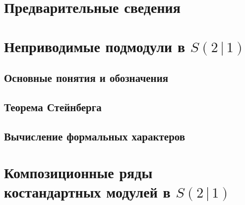 %	
%	

\section{Предварительные сведения}

\section{Неприводимые подмодули в $S(2 \,|\, 1)$}
	\subsection{Основные понятия и обозначения}
%		
	\subsection{Теорема Стейнберга}	
%		
	\subsection{Вычисление формальных характеров}
%		
%		
\section{Композиционные ряды костандартных модулей в $S(2 \,|\, 1)$}
	

